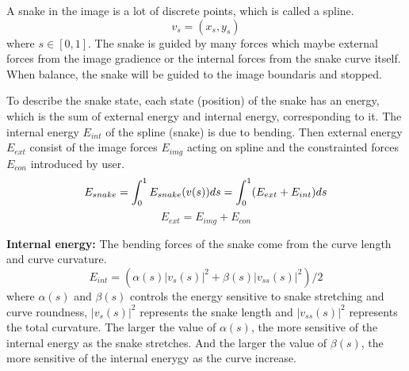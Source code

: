 A snake in the image is a lot of discrete points, which is called a spline.
\begin{equation}
v_s = (x_s, y_s)
\end{equation}
where $s \in [0,1]$. The snake is guided by many forces which maybe external forces from the image gradience or the internal forces from the snake curve itself. When balance, the snake will be guided to the image boundaris and stopped.

To describe the snake state, each state (position) of the snake has an energy, which is the sum of external energy and internal energy, corresponding to it. The internal energy $E_{int}$ of the spline (snake) is due to bending. Then external energy $E_{ext}$ consist of the image forces $E_{img}$ acting on spline and the constrainted forces $E_{con}$ introduced by user. 
\begin{equation}
E_{snake} = \int_0^1E_{snake}(v(s))ds = \int_0^1(E_{ext} + E_{int})ds \\
\end{equation}
\begin{equation}
E_{ext} = E_{img} + E_{con}
\end{equation}

\textbf{Internal energy: } The bending forces of the snake come from the curve length and curve curvature.
\begin{equation}\label{eqn:int-energy}
E_{int} = (\alpha(s)|v_s(s)|^2 + \beta(s)|v_{ss}(s)|^2)/2
\end{equation}
where $\alpha(s)$ and $\beta(s)$ controls the energy sensitive to snake stretching and curve roundness, $|v_s(s)|^2$ represents the snake length and $|v_{ss}(s)|^2$ represents the total curvature. The larger the value of $\alpha(s)$, the more sensitive of the internal energy as the snake stretches. And the larger the value of $\beta(s)$, the more sensitive of the internal enerygy as the curve increase.

